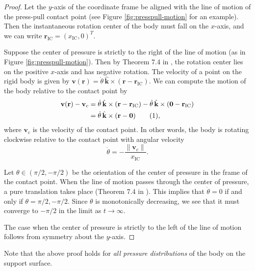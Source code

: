 \documentclass[conference]{IEEEtran}
\newcommand\numberthis{\addtocounter{equation}{1}\tag{\theequation}}
\begin{document}
\begin{proof}
  Let the $y$-axis of the coordinate frame be aligned with the line of
  motion of the press-pull contact point (see Figure
  \ref{fig:presspull-motion} for an example). Then the instantaneous
  rotation center of the body must fall on the $x$-axis, and we can
  write $\mathbf{r}_\text{IC} = (x_\text{IC},0)^T$.

  Suppose the center of pressure is strictly to the right of the line
  of motion (as in Figure \ref{fig:presspull-motion}). Then by Theorem
  7.4 in \cite{Mason}, the rotation center lies on the positive
  $x$-axis and has negative rotation. The velocity of a point on the
  rigid body is given by
  $\mathbf{v}(\mathbf{r}) =
  \dot{\theta}\,\hat{\mathbf{k}}\times(\mathbf{r} -
  \mathbf{r}_\text{IC})$.
  We can compute the motion of the body relative to the contact point
  by
  \begin{align*}
    \mathbf{v}(\mathbf{r}) - \mathbf{v}_c &= \dot{\theta}\,\hat{\mathbf{k}}\times(\mathbf{r} - \mathbf{r}_\text{IC}) - \dot{\theta}\,\hat{\mathbf{k}}\times(\mathbf{0} - \mathbf{r}_\text{IC}) \\
    &= \dot{\theta}\,\hat{\mathbf{k}}\times(\mathbf{r} - \mathbf{0}) \numberthis \label{eqn:rel-rotation-center},
  \end{align*}
  where $\mathbf{v}_c$ is the velocity of the contact point. In other
  words, the body is rotating clockwise relative to the
  contact point with angular velocity
  \begin{equation}
    \dot{\theta} = -\frac{\lVert\mathbf{v}_c\rVert}{x_\text{IC}}.
  \end{equation}

  Let $\theta \in (\pi/2, -\pi/2)$ be the orientation of the center of
  pressure in the frame of the contact point. When the line of motion
  passes through the center of pressure, a pure translation takes
  place (Theorem 7.4 in \cite{Mason}). This implies that
  $\dot{\theta} = 0$ if and only if $\theta = \pi/2, -\pi/2$. Since
  $\theta$ is monotonically decreasing, we see that it must converge
  to $-\pi/2$ in the limit as $t \rightarrow \infty$.

  The case when the center of pressure is strictly to the left of the
  line of motion follows from symmetry about the $y$-axis.
\end{proof}

Note that the above proof holds for \textit{all pressure
  distributions} of the body on the support
surface.
\end{document}
